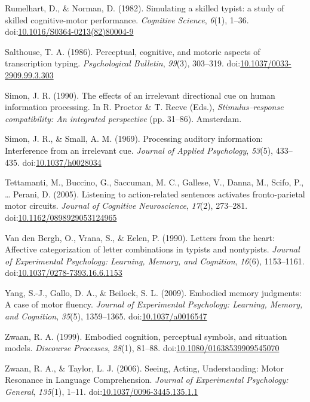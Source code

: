 \documentclass[english,man]{apa6}
\theoremstyle{definition}
\theoremstyle{definition}
\theoremstyle{definition}
\theoremstyle{remark}
\begin{document}
\hypertarget{ref-Rumelhart1982}{}
Rumelhart, D., \& Norman, D. (1982). Simulating a skilled typist: a
study of skilled cognitive-motor performance. \emph{Cognitive Science},
\emph{6}(1), 1--36.
doi:\href{https://doi.org/10.1016/S0364-0213(82)80004-9}{10.1016/S0364-0213(82)80004-9}

\hypertarget{ref-Salthouse1986}{}
Salthouse, T. A. (1986). Perceptual, cognitive, and motoric aspects of
transcription typing. \emph{Psychological Bulletin}, \emph{99}(3),
303--319.
doi:\href{https://doi.org/10.1037/0033-2909.99.3.303}{10.1037/0033-2909.99.3.303}

\hypertarget{ref-Simon1990}{}
Simon, J. R. (1990). The effects of an irrelevant directional cue on
human information processing. In R. Proctor \& T. Reeve (Eds.),
\emph{Stimulus--response compatibility: An integrated perspective} (pp.
31--86). Amsterdam.

\hypertarget{ref-Simon1969}{}
Simon, J. R., \& Small, A. M. (1969). Processing auditory information:
Interference from an irrelevant cue. \emph{Journal of Applied
Psychology}, \emph{53}(5), 433--435.
doi:\href{https://doi.org/10.1037/h0028034}{10.1037/h0028034}

\hypertarget{ref-Tettamanti2005}{}
Tettamanti, M., Buccino, G., Saccuman, M. C., Gallese, V., Danna, M.,
Scifo, P., \ldots{} Perani, D. (2005). Listening to action-related
sentences activates fronto-parietal motor circuits. \emph{Journal of
Cognitive Neuroscience}, \emph{17}(2), 273--281.
doi:\href{https://doi.org/10.1162/0898929053124965}{10.1162/0898929053124965}

\hypertarget{ref-VandenBergh1990}{}
Van den Bergh, O., Vrana, S., \& Eelen, P. (1990). Letters from the
heart: Affective categorization of letter combinations in typists and
nontypists. \emph{Journal of Experimental Psychology: Learning, Memory,
and Cognition}, \emph{16}(6), 1153--1161.
doi:\href{https://doi.org/10.1037/0278-7393.16.6.1153}{10.1037/0278-7393.16.6.1153}

\hypertarget{ref-Yang2009}{}
Yang, S.-J., Gallo, D. A., \& Beilock, S. L. (2009). Embodied memory
judgments: A case of motor fluency. \emph{Journal of Experimental
Psychology: Learning, Memory, and Cognition}, \emph{35}(5), 1359--1365.
doi:\href{https://doi.org/10.1037/a0016547}{10.1037/a0016547}

\hypertarget{ref-Zwaan1999}{}
Zwaan, R. A. (1999). Embodied cognition, perceptual symbols, and
situation models. \emph{Discourse Processes}, \emph{28}(1), 81--88.
doi:\href{https://doi.org/10.1080/01638539909545070}{10.1080/01638539909545070}

\hypertarget{ref-Zwaan2006}{}
Zwaan, R. A., \& Taylor, L. J. (2006). Seeing, Acting, Understanding:
Motor Resonance in Language Comprehension. \emph{Journal of Experimental
Psychology: General}, \emph{135}(1), 1--11.
doi:\href{https://doi.org/10.1037/0096-3445.135.1.1}{10.1037/0096-3445.135.1.1}
\end{document}
